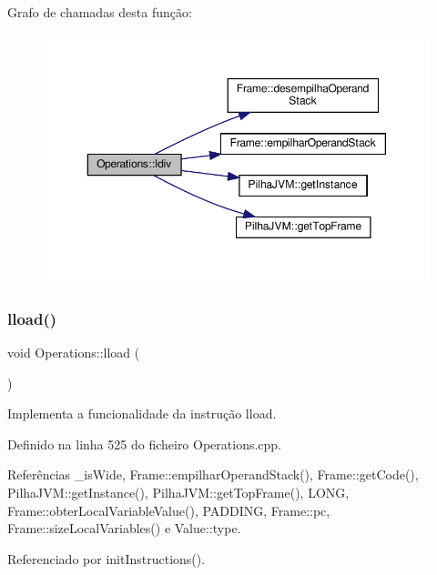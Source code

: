 Grafo de chamadas desta função\+:
\nopagebreak
\begin{figure}[H]
\begin{center}
\leavevmode
\includegraphics[width=350pt]{classOperations_ab9bb90a9db0433e1d04b0eb9bceea9f4_cgraph}
\end{center}
\end{figure}
\mbox{\label{classOperations_abd9d44b782cc5ae7d7985a424a0985c6}} 
\subsubsection{\texorpdfstring{lload()}{lload()}}
{\footnotesize\ttfamily void Operations\+::lload (\begin{DoxyParamCaption}{ }\end{DoxyParamCaption})\hspace{0.3cm}{\ttfamily [private]}}



Implementa a funcionalidade da instrução lload. 



Definido na linha 525 do ficheiro Operations.\+cpp.



Referências \+\_\+is\+Wide, Frame\+::empilhar\+Operand\+Stack(), Frame\+::get\+Code(), Pilha\+J\+V\+M\+::get\+Instance(), Pilha\+J\+V\+M\+::get\+Top\+Frame(), L\+O\+NG, Frame\+::obter\+Local\+Variable\+Value(), P\+A\+D\+D\+I\+NG, Frame\+::pc, Frame\+::size\+Local\+Variables() e Value\+::type.



Referenciado por init\+Instructions().

